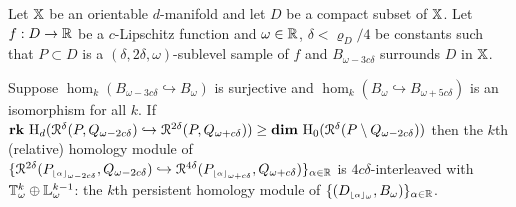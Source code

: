\begin{theorem}\label{thm:main}
  Let $\mathbb{X}$ be an orientable $d$-manifold and let $D$ be a compact subset of $\mathbb{X}$.
  Let $f : D\to\mathbb{R}$ be a $c$-Lipschitz function and $\omega\in\mathbb{R}$, $\delta < \varrho_D/4$ be constants such that $P\subset D$ is a $(\delta, 2\delta,\omega)$-sublevel sample of $f$ and $B_{\omega-3c\delta}$ surrounds $D$ in $\mathbb{X}$.

  Suppose $\hom_k(B_{\omega-3c\delta}\hookrightarrow B_\omega)$ is surjective and $\hom_k(B_\omega\hookrightarrow B_{\omega+5c\delta})$ is an isomorphism for all $k$.
  If $\mathbf{rk}~\mathrm{H}_d(\mathcal{R}^\delta(P, Q_{\omega - 2c\delta})\hookrightarrow \mathcal{R}^{2\delta}(P, Q_{\omega+c\delta})) \geq \mathbf{dim}~\mathrm{H}_0(\mathcal{R}^\delta(P\setminus Q_{\omega-2c\delta}))$ then the $k$th (relative) homology module of $\{\mathcal{R}^{2\delta}(P_{\scriptscriptstyle \lfloor\alpha\rfloor_{\omega-2c\delta}}, Q_{\omega-2c\delta})\hookrightarrow \mathcal{R}^{4\delta}(P_{\scriptscriptstyle \lfloor\alpha\rfloor_{\omega+c\delta}}, Q_{\omega+c\delta})\}_{\alpha\in\mathbb{R}}$ is $4c\delta$-interleaved with $\mathbb{T}_{\omega}^k \oplus \mathbb{L}_\omega^{k-1}$: the $k$th persistent homology module of $\{(D_{\scriptscriptstyle \lfloor\alpha\rfloor_{\omega}}, B_\omega)\}_{\alpha\in\mathbb{R}}$.
\end{theorem}
